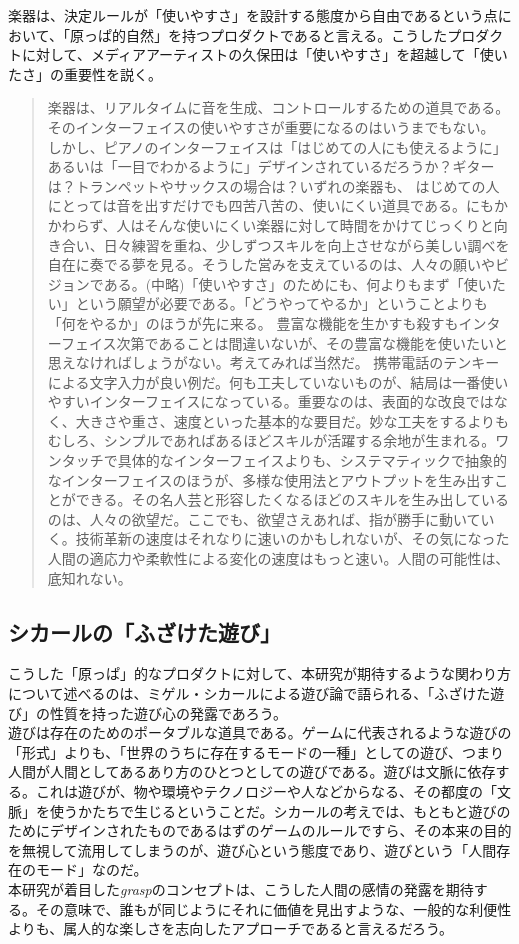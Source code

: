 楽器は、決定ルールが「使いやすさ」を設計する態度から自由であるという点において、「原っぱ的自然」を持つプロダクトであると言える。こうしたプロダクトに対して、メディアアーティストの久保田は「使いやすさ」を超越して「使いたさ」の重要性を説く。

\begin{quote}
  楽器は、リアルタイムに音を生成、コントロールするための道具である。そのインターフェイスの使いやすさが重要になるのはいうまでもない。 しかし、ピアノのインターフェイスは「はじめての人にも使えるように」あるいは「一目でわかるように」デザインされているだろうか？ギターは？トランペットやサックスの場合は？いずれの楽器も、 はじめての人にとっては音を出すだけでも四苦八苦の、使いにくい道具である。にもかかわらず、人はそんな使いにくい楽器に対して時間をかけてじっくりと向き合い、日々練習を重ね、少しずつスキルを向上させながら美しい調べを自在に奏でる夢を見る。そうした営みを支えているのは、人々の願いやビジョンである。(中略)「使いやすさ」のためにも、何よりもまず「使いたい」という願望が必要である。「どうやってやるか」ということよりも「何をやるか」のほうが先に来る。 豊富な機能を生かすも殺すもインターフェイス次第であることは間違いないが、その豊富な機能を使いたいと思えなければしょうがない。考えてみれば当然だ。 携帯電話のテンキーによる文字入力が良い例だ。何も工夫していないものが、結局は一番使いやすいインターフェイスになっている。重要なのは、表面的な改良ではなく、大きさや重さ、速度といった基本的な要目だ。妙な工夫をするよりもむしろ、シンプルであればあるほどスキルが活躍する余地が生まれる。ワンタッチで具体的なインターフェイスよりも、システマティックで抽象的なインターフェイスのほうが、多様な使用法とアウトプットを生み出すことができる。その名人芸と形容したくなるほどのスキルを生み出しているのは、人々の欲望だ。ここでも、欲望さえあれば、指が勝手に動いていく。技術革新の速度はそれなりに速いのかもしれないが、その気になった人間の適応力や柔軟性による変化の速度はもっと速い。人間の可能性は、底知れない。
\end{quote}

\subsection{シカールの「ふざけた遊び」}
こうした「原っぱ」的なプロダクトに対して、本研究が期待するような関わり方について述べるのは、ミゲル・シカールによる遊び論で語られる、「ふざけた遊び」の性質を持った遊び心の発露であろう。\\
遊びは存在のためのポータブルな道具である。ゲームに代表されるような遊びの「形式」よりも、「世界のうちに存在するモードの一種」としての遊び、つまり人間が人間としてあるあり方のひとつとしての遊びである。遊びは文脈に依存する。これは遊びが、物や環境やテクノロジーや人などからなる、その都度の「文脈」を使うかたちで生じるということだ。シカールの考えでは、もともと遊びのためにデザインされたものであるはずのゲームのルールですら、その本来の目的を無視して流用してしまうのが、遊び心という態度であり、遊びという「人間存在のモード」なのだ。\\
本研究が着目した\textit{grasp}のコンセプトは、こうした人間の感情の発露を期待する。その意味で、誰もが同じようにそれに価値を見出すような、一般的な利便性よりも、属人的な楽しさを志向したアプローチであると言えるだろう。